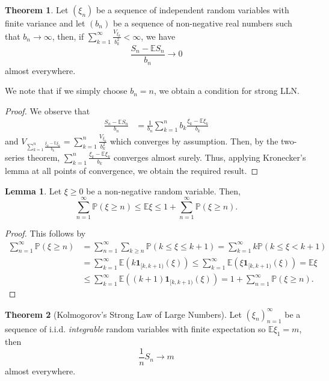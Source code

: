 \documentclass[]{article}
\theoremstyle{definition}
\newtheorem{theorem}{Theorem}
\theoremstyle{definition}
\newtheorem{lemma}{Lemma}[section]
\begin{document}
\begin{theorem}
  Let \((\xi_n)\) be a sequence of independent random variables with finite 
  variance and let \((b_n)\) be a sequence of non-negative real numbers such that 
  \(b_n \to \infty\), then, if \(\sum_{k = 1}^\infty \frac{V_{\xi_k}}{b_k^2} < \infty\),
  we have 
  \[\frac{S_n - \mathbb{E}S_n}{b_n} \to 0\]
  almost everywhere.
  
  We note that if we simply choose \(b_n = n\), we obtain a condition for 
  strong LLN.
\end{theorem}
\begin{proof}
  We observe that 
  \[\begin{split}
    \frac{S_n - \mathbb{E}S_n}{b_n} & = 
    \frac{1}{b_n} \sum_{k = 1}^n b_k \frac{\xi_k - \mathbb{E}\xi_k}{b_k}
  \end{split}\]
  and \(V_{\sum_{k = 1}^n \frac{\xi_k - \mathbb{E}\xi_k}{b_k}} = \sum_{k = 1}^n \frac{V_{\xi_k}}{b_k^2}\)
  which converges by assumption. Then, by the two-series theorem, 
  \(\sum_{k = 1}^n \frac{\xi_k - \mathbb{E}\xi_k}{b_k}\) converges 
  almost surely. Thus, applying Kronecker's lemma at all points of convergence, 
  we obtain the required result.
\end{proof}

\begin{lemma}
  Let \(\xi \ge 0\) be a non-negative random variable. Then, 
  \[\sum_{n = 1}^\infty\mathbb{P}(\xi \ge n) \le \mathbb{E}\xi \le 
    1 + \sum_{n = 1}^\infty\mathbb{P}(\xi \ge n).\]
\end{lemma}
\begin{proof}
  This follows by 
  \[\begin{split}
    \sum_{n = 1}^\infty \mathbb{P}(\xi \ge n) & = 
    \sum_{n = 1}^\infty \sum_{k \ge n} \mathbb{P}(k \le \xi \le k + 1)
    = \sum_{k = 1}^\infty k \mathbb{P}(k \le \xi < k + 1)\\
    & = \sum_{k = 1}^\infty \mathbb{E}(k \mathbf{1}_{[k, k + 1)}(\xi))
    \le \sum_{k = 1}^\infty \mathbb{E}(\xi \mathbf{1}_{[k, k + 1)}(\xi))
    = \mathbb{E}\xi \\
    & \le \sum_{k = 1}^\infty \mathbb{E}((k + 1) \mathbf{1}_{[k, k + 1)}(\xi))
    = 1 + \sum_{n = 1}^\infty\mathbb{P}(\xi \ge n).
  \end{split}\]
\end{proof}

\begin{theorem}[Kolmogorov's Strong Law of Large Numbers]
  Let \((\xi_n)_{n = 1}^\infty\) be a sequence of i.i.d. \textit{integrable} random variables with 
  finite expectation so \(\mathbb{E}\xi_1 = m\), then 
  \[\frac{1}{n}S_n \to m\]
  almost everywhere.
\end{theorem}
\end{document}
